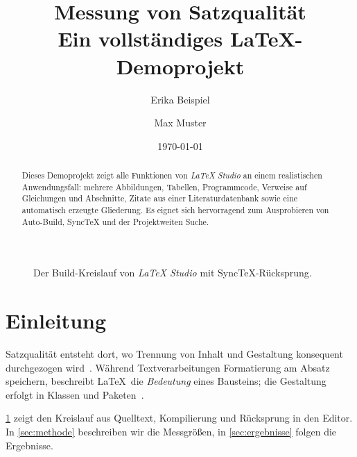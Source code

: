 \documentclass[11pt,a4paper]{article}
\title{Messung von Satzqualität\\[0.4em]\large Ein vollständiges \LaTeX-Demoprojekt}
\author{Erika Beispiel \and Max Muster}
\date{\today}
\begin{document}
\maketitle

\begin{abstract}
  Dieses Demoprojekt zeigt alle Funktionen von \emph{LaTeX Studio} an einem
  realistischen Anwendungsfall: mehrere Abbildungen, Tabellen, Programmcode,
  Verweise auf Gleichungen und Abschnitte, Zitate aus einer Literaturdatenbank
  sowie eine automatisch erzeugte Gliederung. Es eignet sich hervorragend zum
  Ausprobieren von Auto-Build, SyncTeX und der Projektweiten Suche.
\end{abstract}

\begin{figure}[htbp]
  \centering
  \caption{Der Build-Kreislauf von \emph{LaTeX Studio} mit SyncTeX-Rücksprung.}
  \label{fig:pipeline}
\end{figure}

\section{Einleitung}
\label{sec:intro}

Satzqualität entsteht dort, wo Trennung von Inhalt und Gestaltung konsequent
durchgezogen wird~\cite{lamport1994}. Während Textverarbeitungen Formatierung
am Absatz speichern, beschreibt \LaTeX\ die \emph{Bedeutung} eines Bausteins;
die Gestaltung erfolgt in Klassen und Paketen~\cite{kopka2003,mittelbach2004}.

\cref{fig:pipeline} zeigt den Kreislauf aus Quelltext, Kompilierung und
Rücksprung in den Editor. In \cref{sec:methode} beschreiben wir die Messgrößen,
in \cref{sec:ergebnisse} folgen die Ergebnisse.
\end{document}
